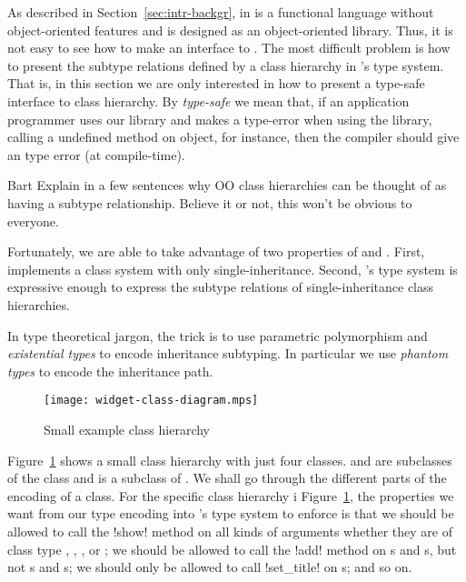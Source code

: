 \documentclass[workingdraft]{usetex-v1}
\begin{document}
As described in Section~\ref{sec:intr-backgr}, \sml in is a functional
language without object-oriented features and \gtk is designed as an
object-oriented library.  Thus, it is not easy to see how to make an \sml
interface to \gtk.  The most difficult problem is how to present the
subtype relations defined by a class hierarchy in \sml's type system.
That is, in this section we are only interested in how to present a
type-safe \sml interface to \gtk class hierarchy.  By \emph{type-safe} we
mean that, if an \sml application programmer uses our library and
makes a type-error when using the \gtk library, calling a undefined
method on object, for instance, then the \sml compiler should give an
type error (at compile-time).


\begin{ednote}{Bart}
  Explain in a few sentences why OO class hierarchies can be
  thought of as having a subtype relationship.  Believe it or
  not, this won't be obvious to everyone.
\end{ednote}

Fortunately, we are able to take advantage of two properties of \gtk
and \sml.  First, \gtk implements a class system with only
single-inheritance.  Second, \sml's type system is expressive enough
to express the subtype relations of single-inheritance class
hierarchies.  



In type theoretical jargon, the trick is to use parametric
polymorphism and \emph{existential types} to encode inheritance
subtyping.  In particular we use \emph{phantom types} to encode the
inheritance path.


\begin{figure}[htp]
  \centering
  \texttt{[image: widget-class-diagram.mps]}
  \caption{Small example class hierarchy}
  \label{fig:class-hierarchy}
\end{figure}

Figure~\ref{fig:class-hierarchy} shows a small class hierarchy with
just four classes.  and  are
subclasses of the class  and  is a
subclass of .  We shall go through the different
parts of the encoding of a class.  For the specific class hierarchy i
Figure~\ref{fig:class-hierarchy}, the properties we want from our
type encoding into \sml's type system to enforce is that we should be
allowed to call the !show! method on all kinds of arguments whether
they are of class type , ,
, or ; we should be allowed to
call the !add! method on s and
s, but not s and
s; we should only be allowed to call !set_title! on
s; and so on. 
\end{document}
